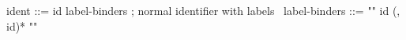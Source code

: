 \begin{syntax}
  ident ::= id label-binders ; normal identifier with labels
  \
  label-binders ::= "{" id (, id)* "}"
\end{syntax}
